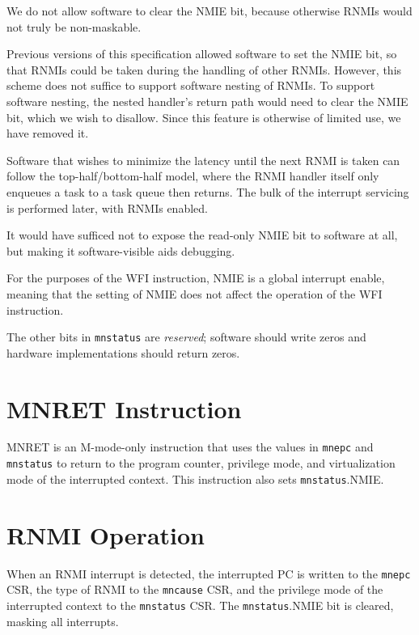\begin{commentary}
We do not allow software to clear the NMIE bit, because otherwise RNMIs
would not truly be non-maskable.

Previous versions of this specification allowed software to set the NMIE bit,
so that RNMIs could be taken during the handling of other RNMIs.
However, this scheme does not suffice to support software nesting of RNMIs.
To support software nesting, the nested handler's return path would need to
clear the NMIE bit, which we wish to disallow.
Since this feature is otherwise of limited use, we have removed it.

Software that wishes to minimize the latency until the next RNMI is taken can
follow the top-half/bottom-half model, where the RNMI handler itself only
enqueues a task to a task queue then returns.
The bulk of the interrupt servicing is performed later, with RNMIs enabled.

It would have sufficed not to expose the read-only NMIE bit to software at
all, but making it software-visible aids debugging.
\end{commentary}

For the purposes of the WFI instruction, NMIE is a global interrupt enable,
meaning that the setting of NMIE does not affect the operation of the WFI
instruction.

The other
bits in {\tt mnstatus} are {\em reserved}; software should write zeros and
hardware implementations should return zeros.

\section{MNRET Instruction}

MNRET is an M-mode-only instruction that uses the values in {\tt mnepc} and
{\tt mnstatus} to return to the program counter, privilege mode,
and virtualization mode of the interrupted context.
This instruction also sets {\tt mnstatus}.NMIE.

\section{RNMI Operation}

When an RNMI interrupt is detected, the interrupted PC is written to
the {\tt mnepc} CSR, the type of RNMI to the {\tt mncause} CSR, and the
privilege mode of the interrupted context to the {\tt mnstatus} CSR.
The {\tt mnstatus}.NMIE bit is cleared, masking all interrupts.

